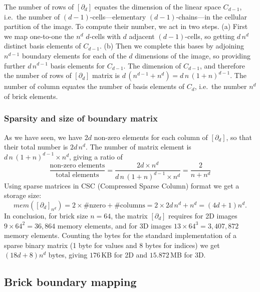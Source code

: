 The number of rows of $[\partial_d]$ equates the dimension of the linear space $C_{d-1}$, i.e.~the number of $(d-1)$-cells---elementary $(d-1)$-chains---in the cellular partition of the image. To compute their number, we act in two steps. (a) First we map one-to-one the $n^d$ $d$-cells with $d$ adjacent $(d-1)$-cells, so getting $d\,n^d$ distinct basis elements of $C_{d-1}$. (b) Then we complete this bases by adjoining $n^{d-1}$ boundary elements for each of the $d$ dimensions of the image, so providing further $d\,n^{d-1}$ basis elements for $C_{d-1}$. The dimension of $C_{d-1}$, and therefore the number of rows of $[\partial_d]$ matrix is $d\,(n^{d-1}+n^{d}) = d\,n\,(1+n)^{d-1}$. The number of column equates the number of basis elements of $C_d$, i.e.~the number $n^d$ of brick elements.

\subsubsection*{Sparsity and size of boundary matrix }\label{sec:bm-size}

As we have seen, we have $2d$ non-zero elements for each column of $[\partial_d]$, so that their total number is $2d\,n^d$. The number of matrix element is $d\,n\,(1+n)^{d-1} \times n^d$, giving a ratio of 
\[
\frac{\mbox{non-zero\ elements}}{\mbox{total\ elements}} = 
\frac{2d\times n^d}{d\,n\,(1+n)^{d-1} \times n^d} =
\frac{2}{n+n^d}
\]
Using sparse matrices in CSC (Compressed Sparse Column) format we get a storage size:
\[
mem([\partial_d]_{n^d}) = 2\times \#\mbox{nzero} + \#\mbox{columns} = 2\times 2d\,n^d + n^d = (4d+1)n^d.
\]
In conclusion, for brick size $n=64$, the matrix $[\partial_d]$ requires for 2D images $9\times 64^2=36,864$ memory elements, and for 3D images $13\times 64^3=3,407,872$ memory elements. Counting the bytes for the standard implementation of a sparse binary matrix (1 byte for values and 8 bytes for indices) we get $(18d+8)n^d$ bytes, giving $176$\,KB for 2D and $15.872$\,MB for 3D.





\subsection{Brick boundary mapping}\label{sec:brick-mapping}

